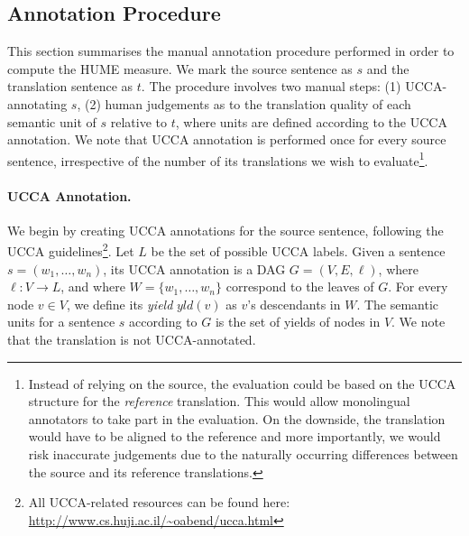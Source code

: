 \documentclass[11pt]{article}
\begin{document}
\subsection{Annotation Procedure}\label{sec:guidelines}

This section summarises the manual annotation procedure performed in order 
to compute the HUME measure. 
We mark the source sentence as $s$ and the translation sentence as $t$. 
The procedure involves two manual steps: (1) UCCA-annotating $s$, 
(2) human judgements as to the translation quality of each semantic unit of $s$ relative to $t$,
where units are defined according to the UCCA annotation.
We note that UCCA annotation is performed once for every source sentence,
irrespective of the number of its translations we wish
to evaluate\footnote{Instead of relying on the source,
the evaluation could be based on the UCCA structure for the \emph{reference}
translation. This would allow monolingual annotators to take part in the
evaluation. On the downside, the translation would have to be aligned to the
reference and more importantly, we would risk inaccurate judgements due to
the naturally occurring differences between the source and its reference
translations.}.

\paragraph{UCCA Annotation.}
We begin by creating UCCA annotations for the source sentence, following the
UCCA guidelines\footnote{All UCCA-related resources can be found
  here: \url{http://www.cs.huji.ac.il/~oabend/ucca.html}}.
Let $L$ be the set of possible UCCA labels.
Given a sentence $s = (w_1, \ldots,w_n)$, its UCCA annotation is a DAG $G=(V,E,\ell)$,
where $\ell: V \rightarrow L$, and where $W = \{w_1,\ldots,w_n\}$ correspond to the leaves of $G$.
For every node $v \in V$, we define its {\it yield} $yld(v)$ as $v$'s descendants in $W$.
The semantic units for a sentence $s$ according to $G$
is the set of yields of nodes in $V$. 
We note that the translation is not UCCA-annotated.

\end{document}

